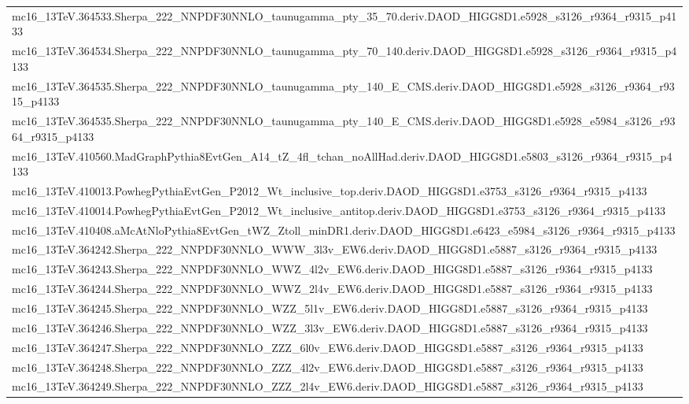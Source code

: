 \begin{adjustwidth}{-3em}{-3em}
\begin{longtable}{l}
mc16\_13TeV.364533.Sherpa\_222\_NNPDF30NNLO\_taunugamma\_pty\_35\_70.deriv.DAOD\_HIGG8D1.e5928\_s3126\_r9364\_r9315\_p4133 \\
mc16\_13TeV.364534.Sherpa\_222\_NNPDF30NNLO\_taunugamma\_pty\_70\_140.deriv.DAOD\_HIGG8D1.e5928\_s3126\_r9364\_r9315\_p4133 \\
mc16\_13TeV.364535.Sherpa\_222\_NNPDF30NNLO\_taunugamma\_pty\_140\_E\_CMS.deriv.DAOD\_HIGG8D1.e5928\_s3126\_r9364\_r9315\_p4133 \\
mc16\_13TeV.364535.Sherpa\_222\_NNPDF30NNLO\_taunugamma\_pty\_140\_E\_CMS.deriv.DAOD\_HIGG8D1.e5928\_e5984\_s3126\_r9364\_r9315\_p4133 \\
mc16\_13TeV.410560.MadGraphPythia8EvtGen\_A14\_tZ\_4fl\_tchan\_noAllHad.deriv.DAOD\_HIGG8D1.e5803\_s3126\_r9364\_r9315\_p4133 \\
mc16\_13TeV.410013.PowhegPythiaEvtGen\_P2012\_Wt\_inclusive\_top.deriv.DAOD\_HIGG8D1.e3753\_s3126\_r9364\_r9315\_p4133 \\
mc16\_13TeV.410014.PowhegPythiaEvtGen\_P2012\_Wt\_inclusive\_antitop.deriv.DAOD\_HIGG8D1.e3753\_s3126\_r9364\_r9315\_p4133 \\
mc16\_13TeV.410408.aMcAtNloPythia8EvtGen\_tWZ\_Ztoll\_minDR1.deriv.DAOD\_HIGG8D1.e6423\_e5984\_s3126\_r9364\_r9315\_p4133 \\
mc16\_13TeV.364242.Sherpa\_222\_NNPDF30NNLO\_WWW\_3l3v\_EW6.deriv.DAOD\_HIGG8D1.e5887\_s3126\_r9364\_r9315\_p4133 \\
mc16\_13TeV.364243.Sherpa\_222\_NNPDF30NNLO\_WWZ\_4l2v\_EW6.deriv.DAOD\_HIGG8D1.e5887\_s3126\_r9364\_r9315\_p4133 \\
mc16\_13TeV.364244.Sherpa\_222\_NNPDF30NNLO\_WWZ\_2l4v\_EW6.deriv.DAOD\_HIGG8D1.e5887\_s3126\_r9364\_r9315\_p4133 \\
mc16\_13TeV.364245.Sherpa\_222\_NNPDF30NNLO\_WZZ\_5l1v\_EW6.deriv.DAOD\_HIGG8D1.e5887\_s3126\_r9364\_r9315\_p4133 \\
mc16\_13TeV.364246.Sherpa\_222\_NNPDF30NNLO\_WZZ\_3l3v\_EW6.deriv.DAOD\_HIGG8D1.e5887\_s3126\_r9364\_r9315\_p4133 \\
mc16\_13TeV.364247.Sherpa\_222\_NNPDF30NNLO\_ZZZ\_6l0v\_EW6.deriv.DAOD\_HIGG8D1.e5887\_s3126\_r9364\_r9315\_p4133 \\
mc16\_13TeV.364248.Sherpa\_222\_NNPDF30NNLO\_ZZZ\_4l2v\_EW6.deriv.DAOD\_HIGG8D1.e5887\_s3126\_r9364\_r9315\_p4133 \\
mc16\_13TeV.364249.Sherpa\_222\_NNPDF30NNLO\_ZZZ\_2l4v\_EW6.deriv.DAOD\_HIGG8D1.e5887\_s3126\_r9364\_r9315\_p4133 \\

\end{longtable}
\end{adjustwidth}
